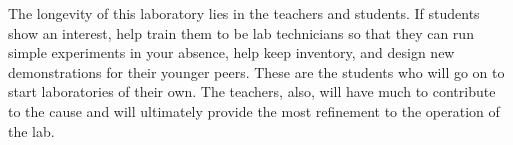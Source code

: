 The longevity of this laboratory lies in the teachers and students.  If students show an interest, help train them to be lab technicians so that they can run simple experiments in your absence, help keep inventory, and design new demonstrations for their younger peers.  These are the students who will go on to start laboratories of their own.  The teachers, also, will have much to contribute to the cause and will ultimately provide the most refinement to the operation of the lab.
